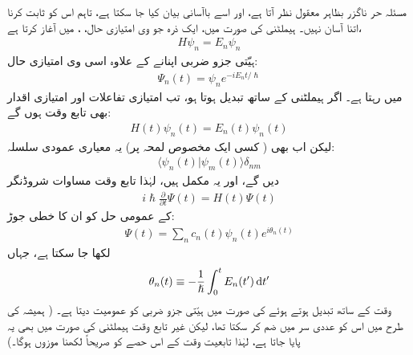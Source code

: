  
مسئلہ حر ناگزر بظاہر معقول نظر آتا ہے، اور اسے باآسانی بیان کیا جا سکتا ہے، تاہم اس کو ثابت کرنا اتنا آسان نہیں۔  ہیملٹنی کی صورت میں، ایک ذرہ جو  وی امتیازی حال، ، میں آغاز کرتا ہے،
\begin{align}
H \psi_n = E_n \psi_n
\end{align}
 ہیّتی جزو ضربی اپنانے کے علاوہ اسی  وی امتیازی حال:
\begin{align}
\Psi_n (t) = \psi_n e^{-i E_n t/ \hslash}
\end{align}
میں رہتا ہے۔ اگر ہیملٹنی  کے ساتھ تبدیل ہوتا ہو، تب امتیازی تفاعلات اور امتیازی اقدار بھی تابع وقت ہوں گے:
\begin{align}\label{مساوات_حر_تابع_وقت_ہیملٹنی_توانائی}
H(t) \psi_n (t) = E_n (t) \psi_n (t)
\end{align}
لیکن اب بھی ( کسی ایک مخصوص لمحہ پر) یہ معیاری عمودی سلسلہ: 
\begin{align}\label{مساوات_حر_لمحاتی_معیاری_عمودی}
\langle \psi_n (t) | \psi_m (t) \rangle \delta_{nm} 
\end{align}
دیں گے، اور یہ مکمل ہیں، لہٰذا تابع وقت مساوات شروڈنگر 
\begin{align}\label{مساوات_حر_مساوات_شروڈنگر_الف}
i \hslash \frac{\partial}{\partial t} \Psi (t) = H (t) \Psi (t)
\end{align}
کے عمومی حل کو ان کا خطی جوڑ:
\begin{align}\label{مساوات_حر_مساوات_شروڈنگر_ب}
\Psi (t) = \sum_n c_n (t) \psi_n (t) e^{i \theta_n (t)}
\end{align}
لکھا جا سکتا ہے، جہاں 
\begin{align}\label{مساوات_حر_مساوات_شروڈنگر_پ}
\theta_n (t) \equiv - \frac{1}{\hslash} \int_0^t E_n (t') \dif t'
\end{align}
وقت کے ساتھ تبدیل ہوتے ہوئے  کی صورت میں  ہیّتی جزو ضربی کو عمومیت دیتا ہے۔ ( ہمیشہ کی طرح میں اس کو عددی سر  میں ضم کر سکتا تھا، لیکن غیر تابع وقت ہیملٹنی کی صورت میں بھی یہ پایا جاتا ہے، لہٰذا تابعیت وقت کے اس حصے کو صریحاً لکھنا موزوں ہوگا۔) 

